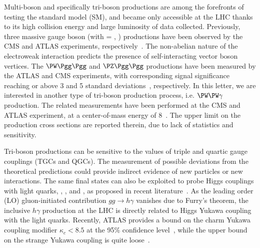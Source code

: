 
\maketitle 

Multi-boson and specifically tri-boson productions are among the forefronts of testing the standard model (SM), and became only accessible at the LHC thanks to its high collision energy and large luminosity of data collected. Previously, three massive gauge boson (\PV\PV\PV with \PV = \PW, \PZ) productions have been observed by the CMS and ATLAS experiments, respectively~\cite{CMS:2020hjs,ATLAS:2021atz}. The non-abelian nature of the electroweak interaction predicts the presence of self-interacting vector boson vertices. The $\PW\Pgg\Pgg$ and $\PZ\Pgg\Pgg$ productions have been measured by the ATLAS and CMS experiments, with corresponding signal significance reaching or above 3 and 5 standard deviations~\cite{ATLAS:2015ify,ATLAS:2016qjc,CMS:2017tzy,CMS:2021jji}, respectively. In this letter, we are interested in another type of tri-boson production process, i.e. $\PW\PW\gamma$ production. The related measurements have been performed at the CMS and ATLAS experiment, at a center-of-mass energy of 8\TeV~\cite{CMS:2014cdf,ATLAS:2017bon}. The upper limit on the production cross sections are reported therein, due to lack of statistics and sensitivity.

Tri-boson productions can be sensitive to the values of triple and quartic gauge couplings (TGCs and QGCs). The measurement of possible deviations from the theoretical predictions could provide indirect evidence of new particles or new interactions. The same final states can also be exploited to probe Higgs couplings with light quarks, \PQc, \PQs, \PQu and \PQd, as proposed in recent literature~\cite{Khanpour:2017inb,Aguilar-Saavedra:2020rgo,Falkowski:2020znk}. As the leading order (LO) gluon-initiated contribution $gg\rightarrow h\gamma$ vanishes due to Furry’s theorem, the inclusive $h\gamma$ production at the LHC is directly related to Higgs Yukawa coupling with the light quarks. Recently, ATLAS provides a bound on the charm Yukawa coupling modifier $\kappa_c<8.5$ at the 95\% confidence level~\cite{ATLAS:2021zwx}, while the upper bound on the strange Yukawa coupling is quite loose~\cite{Duarte-Campderros:2018ouv,ATLAS:2018xfc}.

